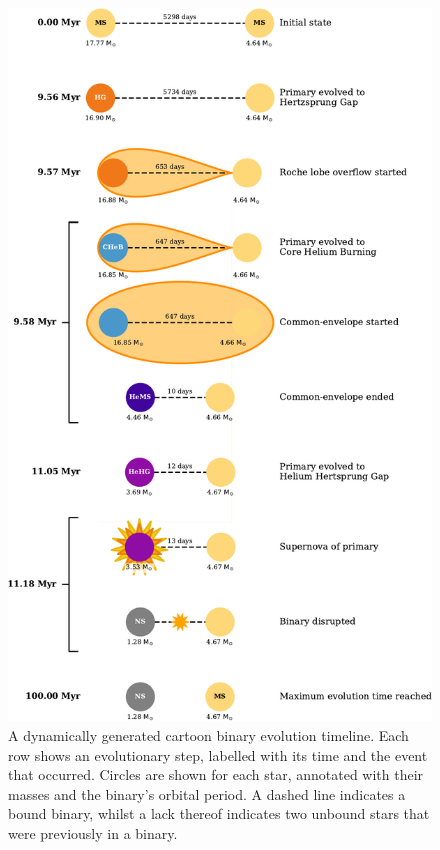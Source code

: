 \documentclass[twocolumn, twocolappendix, oneside]{aastex631}
\begin{document}
\begin{figure}
    \centering
    \includegraphics[width=\columnwidth]{figures/example_cartoon.pdf}
    \caption{A dynamically generated cartoon binary evolution timeline. Each row shows an evolutionary step, labelled with its time and the event that occurred. Circles are shown for each star, annotated with their masses and the binary's orbital period. A dashed line indicates a bound binary, whilst a lack thereof indicates two unbound stars that were previously in a binary.}
    \label{fig:cartoon-binary}
\end{figure}
\end{document}
